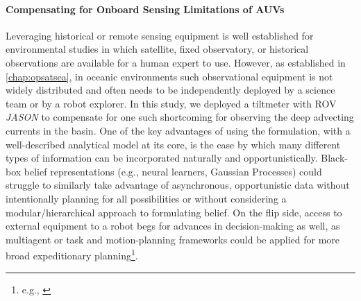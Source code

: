 \paragraph{Compensating for Onboard Sensing Limitations of AUVs}
Leveraging historical or remote sensing equipment is well established for environmental studies in which satellite, fixed observatory, or historical observations are available for a human expert to use. However, as established in \cref{chap:opsatsea}, in oceanic environments such observational equipment is not widely distributed and often needs to be independently deployed by a science team or by a robot explorer. In this study, we deployed a tiltmeter with ROV \emph{JASON} to compensate for one such shortcoming for observing the deep advecting currents in the basin. One of the key advantages of using the \PHUMES formulation, with a well-described analytical model at its core, is the ease by which many different types of information can be incorporated naturally and opportunistically. Black-box belief representations (e.g., neural learners, Gaussian Processes) could struggle to similarly take advantage of asynchronous, opportunistic data without intentionally planning for all possibilities or without considering a modular/hierarchical approach to formulating belief. On the flip side, access to external equipment to a robot begs for advances in decision-making as well, as multiagent\autocite{salam2019adaptive,li2014multi,luo2018adaptive,ouyang2014multi} or task and motion-planning frameworks could be applied for more broad expeditionary planning\footnote{e.g., \autocite{timmons2019automated}}. 

